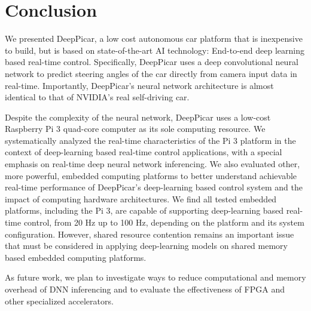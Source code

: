 \section{Conclusion}\label{sec:conclusion}
We presented DeepPicar, a low cost autonomous car platform that is
inexpensive to build, but is based on state-of-the-art AI technology:
End-to-end deep learning based real-time control.
Specifically, DeepPicar uses a deep convolutional neural network to
predict steering angles of the car directly from camera input data
in real-time. Importantly, DeepPicar's neural network architecture is
almost identical to that of NVIDIA's real self-driving car. 

Despite the complexity of the neural network, DeepPicar uses a
low-cost Raspberry Pi 3 quad-core computer as its sole computing
resource. We systematically analyzed the real-time characteristics of
the Pi 3 platform in the context of deep-learning based real-time
control applications, with a special emphasis on real-time deep neural
network inferencing.
We also evaluated other, more powerful, embedded computing
platforms to better understand achievable real-time performance of
DeepPicar's deep-learning based control system and the impact of
computing hardware architectures.
We find all tested embedded platforms, including the Pi 3, are capable
of supporting deep-learning based real-time control, from 20 Hz up to
100 Hz, depending on the platform and its system
configuration. However, shared resource contention remains an
important issue that must be considered in applying deep-learning
models on shared memory based embedded computing platforms.

As future work, we plan to investigate ways to reduce computational
and memory overhead of DNN inferencing and to evaluate the
effectiveness of FPGA and other specialized accelerators.


